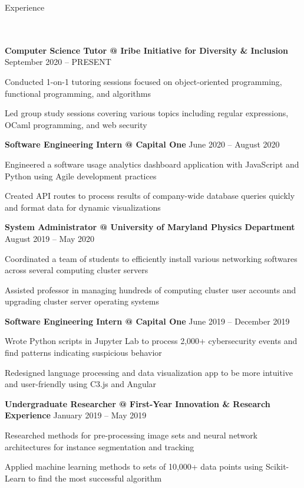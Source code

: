 \documentclass{article}
\newcommand{\header}[1]{{
\hspace*{-15pt}\vspace*{6pt} \large{#1}} \vspace*{-6pt} 
\lineunder
}
\newcommand{\lineunder}{
\vspace*{-8pt} \\ \hspace*{-18pt} 
\hrulefill \\
}
\newcommand{\employer}[4]{{
\vspace*{2pt}%
\textbf{#1} #2 \hfill #3\\ #4 \vspace*{2pt}}
}
\renewcommand{\labelitemii}{
$\vcenter{\hbox{\tiny$\bullet$}}$\hspace*{-3pt}
}
\newenvironment{bullet-list-minor}{
\begin{list}{\labelitemii}{\setlength\leftmargin{15pt} 
\topsep 0pt \itemsep -2pt}}{\vspace*{4pt}\end{list}
}
\begin{document}
\vspace*{4pt}%
\header{Experience}
    \vspace{4pt}
    \employer{Computer Science Tutor @ Iribe Initiative for Diversity \& Inclusion}{}{September 2020 -- PRESENT}{}
	\begin{bullet-list-minor}
	\item Conducted 1-on-1 tutoring sessions focused on object-oriented programming, functional programming, and algorithms
    \item Led group study sessions covering various topics including regular expressions, OCaml programming, and web security
    \end{bullet-list-minor}
    \smallskip
    \employer{Software Engineering Intern @ Capital One}{}{June 2020 -- August 2020}{}
	\begin{bullet-list-minor}
	\item Engineered a software usage analytics dashboard application with JavaScript and Python using Agile development practices
	\item Created API routes to process results of company-wide database queries quickly and format data for dynamic visualizations
    \end{bullet-list-minor}
    \smallskip
    \employer{System Administrator @ University of Maryland Physics Department}{}{August 2019 -- May 2020}{}
	\begin{bullet-list-minor}
	\item Coordinated a team of students to efficiently install various networking softwares across several computing cluster servers
	\item Assisted professor in managing hundreds of computing cluster user accounts and upgrading cluster server operating systems
    \end{bullet-list-minor}
    \smallskip  
    \employer{Software Engineering Intern @ Capital One}{}{June 2019 -- December 2019}{}
	\begin{bullet-list-minor}
	\item Wrote Python scripts in Jupyter Lab to process 2,000+  cybersecurity events and find patterns indicating suspicious behavior
	\item Redesigned language processing and data visualization app to be more intuitive and user-friendly using C3.js and Angular
    \end{bullet-list-minor}
    \smallskip    
    \employer{Undergraduate Researcher @ First-Year Innovation \& Research Experience}{}{January 2019 -- May 2019}{}
	\begin{bullet-list-minor}
	\item Researched methods for pre-processing image sets and neural network architectures for instance segmentation and tracking
	\item Applied machine learning methods to sets of 10,000+ data points using Scikit-Learn to find the most successful algorithm
    \end{bullet-list-minor}
\end{document}
